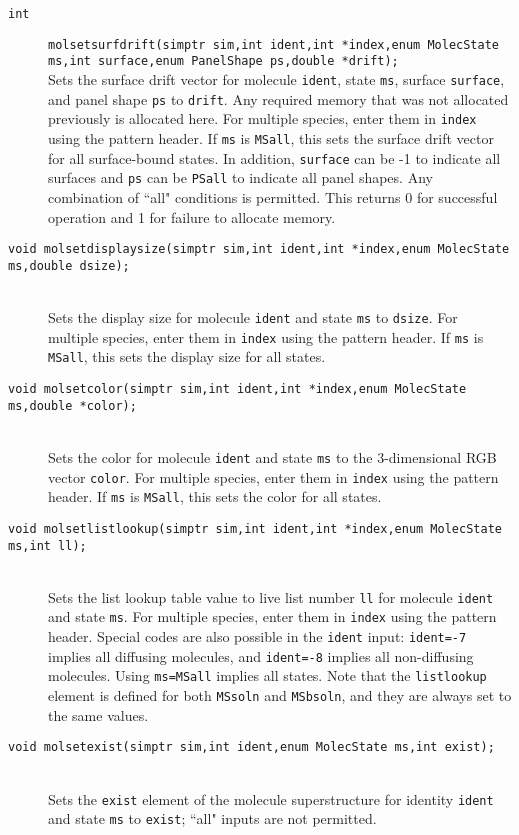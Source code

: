 \documentclass {scrbook}
\newcommand {\ttt} {\texttt}
\begin{document}
\begin{description}
\item[\ttt{int}]
\ttt{molsetsurfdrift(simptr sim,int ident,int *index,enum MolecState ms,int surface,enum PanelShape ps,double *drift);}
\hfill \\
Sets the surface drift vector for molecule \ttt{ident}, state \ttt{ms}, surface \ttt{surface}, and panel shape \ttt{ps} to \ttt{drift}. Any required memory that was not allocated previously is allocated here. For multiple species, enter them in \ttt{index} using the pattern header. If \ttt{ms} is \ttt{MSall}, this sets the surface drift vector for all surface-bound states. In addition, \ttt{surface} can be -1 to indicate all surfaces and \ttt{ps} can be \ttt{PSall} to indicate all panel shapes. Any combination of ``all" conditions is permitted. This returns 0 for successful operation and 1 for failure to allocate memory.

\item[\ttt{void molsetdisplaysize(simptr sim,int ident,int *index,enum MolecState ms,double dsize);}]
\hfill \\
Sets the display size for molecule \ttt{ident} and state \ttt{ms} to \ttt{dsize}. For multiple species, enter them in \ttt{index} using the pattern header. If \ttt{ms} is \ttt{MSall}, this sets the display size for all states.

\item[\ttt{void molsetcolor(simptr sim,int ident,int *index,enum MolecState ms,double *color);}]
\hfill \\
Sets the color for molecule \ttt{ident} and state \ttt{ms} to the 3-dimensional RGB vector \ttt{color}. For multiple species, enter them in \ttt{index} using the pattern header. If \ttt{ms} is \ttt{MSall}, this sets the color for all states.

\item[\ttt{void molsetlistlookup(simptr sim,int ident,int *index,enum MolecState ms,int ll);}]
\hfill \\
Sets the list lookup table value to live list number \ttt{ll} for molecule \ttt{ident} and state \ttt{ms}. For multiple species, enter them in \ttt{index} using the pattern header. Special codes are also possible in the \ttt{ident} input: \ttt{ident=-7} implies all diffusing molecules, and \ttt{ident=-8} implies all non-diffusing molecules. Using \ttt{ms=MSall} implies all states. Note that the \ttt{listlookup} element is defined for both \ttt{MSsoln} and \ttt{MSbsoln}, and they are always set to the same values.

\item[\ttt{void molsetexist(simptr sim,int ident,enum MolecState ms,int exist);}]
\hfill \\
Sets the \ttt{exist} element of the molecule superstructure for identity \ttt{ident} and state \ttt{ms} to \ttt{exist}; ``all" inputs are not permitted.


\end{description}
\end{document}
